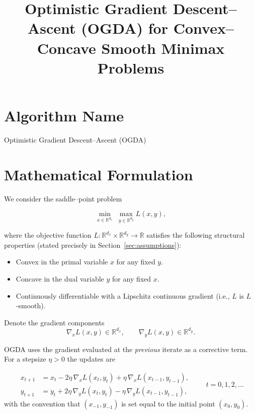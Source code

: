 \documentclass{article}
\begin{document}
\title{Optimistic Gradient Descent–Ascent (OGDA) for Convex–Concave Smooth Minimax Problems}
\author{}
\date{}
\maketitle

\tableofcontents

\newpage

\section*{Algorithm Name}
Optimistic Gradient Descent–Ascent (OGDA)

\section{Mathematical Formulation}
We consider the saddle–point problem  

\[
\min_{x\in\mathbb{R}^{d_x}}\;\max_{y\in\mathbb{R}^{d_y}} L(x,y),
\]

where the objective function \(L:\mathbb{R}^{d_x}\times\mathbb{R}^{d_y}\to\mathbb{R}\) satisfies the following structural properties (stated precisely in Section~\ref{sec:assumptions}):

\begin{itemize}
    \item Convex in the primal variable \(x\) for any fixed \(y\).
    \item Concave in the dual variable \(y\) for any fixed \(x\).
    \item Continuously differentiable with a Lipschitz continuous gradient (i.e., $L$ is $L$‑smooth).
\end{itemize}

Denote the gradient components
\[
\nabla_x L(x,y)\in\mathbb{R}^{d_x},\qquad 
\nabla_y L(x,y)\in\mathbb{R}^{d_y}.
\]

OGDA uses the gradient evaluated at the \emph{previous} iterate as a corrective term.  
For a stepsize \(\eta>0\) the updates are

\[
\boxed{
\begin{aligned}
x_{t+1}&=x_{t}-2\eta\,\nabla_{x}L(x_{t},y_{t})+\eta\,\nabla_{x}L(x_{t-1},y_{t-1}),\\[0.2cm]
y_{t+1}&=y_{t}+2\eta\,\nabla_{y}L(x_{t},y_{t})-\eta\,\nabla_{y}L(x_{t-1},y_{t-1}),
\end{aligned}}
\qquad t=0,1,2,\dots
\]
with the convention that \((x_{-1},y_{-1})\) is set equal to the initial point \((x_{0},y_{0})\).
\end{document}
